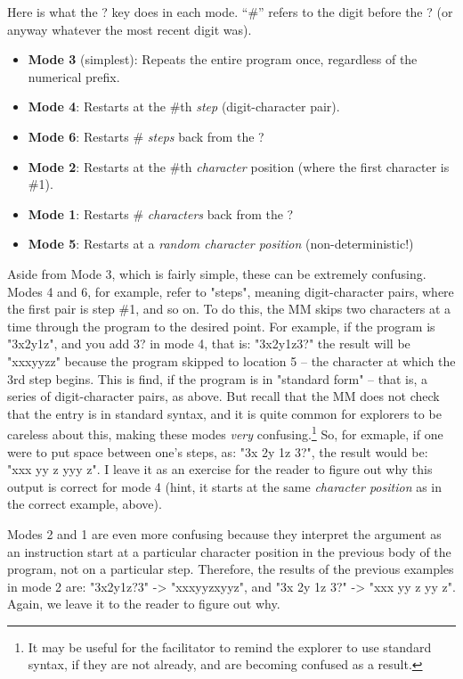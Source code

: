 \documentclass[12pt,letterpaper]{article}
\begin{document}
Here is what the ? key does in each mode. ``\#'' refers to the digit before the ? (or anyway whatever the most recent digit was). 

\begin{itemize}
\item \textbf{Mode 3} (simplest): Repeats the entire program once, regardless of the numerical prefix. 
\item \textbf{Mode 4}: Restarts at the \#th \textit{step} (digit-character pair).
\item \textbf{Mode 6}: Restarts \# \textit{steps} back from the ?
\item \textbf{Mode 2}: Restarts at the \#th \textit{character} position (where the first character is \#1).
\item \textbf{Mode 1}: Restarts \# \textit{characters} back from the ?
\item \textbf{Mode 5}: Restarts at a \textit{random character position} (non-deterministic!)
\end{itemize}

Aside from Mode 3, which is fairly simple, these can be extremely confusing. Modes 4 and 6, for example, refer to "steps", meaning digit-character pairs, where the first pair is step \#1, and so on. To do this, the MM skips two characters at a time through the program to the desired point. For example, if the program is "3x2y1z", and you add 3? in mode 4, that is: "3x2y1z3?" the result will be "xxxyyzz" because the program skipped to location 5 -- the character at which the 3rd step begins. This is find, if the program is in "standard form" -- that is, a series of digit-character pairs, as above. But recall that the MM does not check that the entry is in standard syntax, and it is quite common for explorers to be careless about this, making these modes \textit{very} confusing.\footnote{It may be useful for the facilitator to remind the explorer to use standard syntax, if they are not already, and are becoming confused as a result.} So, for exmaple, if one were to put space between one's steps, as: "3x 2y 1z 3?", the result would be: "xxx   yy  z yyy   z". I leave it as an exercise for the reader to figure out why this output is correct for mode 4 (hint, it starts at the same \textit{character position} as in the correct example, above). 

Modes 2 and 1 are even more confusing because they interpret the argument as an instruction start at a particular character position in the previous body of the program, not on a particular step. Therefore, the results of the previous examples in mode 2 are: "3x2y1z?3"
-> "xxxyyzxyyz", and "3x 2y 1z 3?" -> 
"xxx   yy  z yy  z". Again, we leave it to the reader to figure out why.
\end{document}
